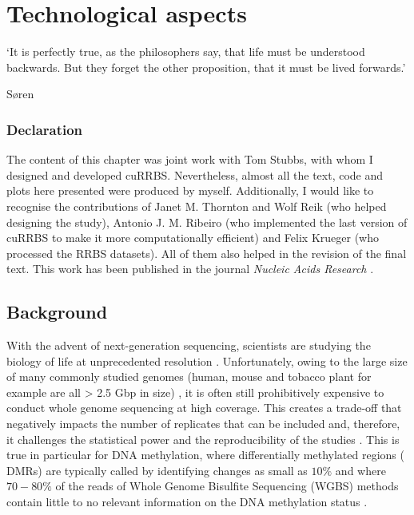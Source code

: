 
\chapter{Technological aspects} \label{c:4}

\ifpdf
	\graphicspath{{Chapter4/Figs/pdf/}}
\else
	\graphicspath{{Chapter4/Figs/svg/}}
\fi

\epigraph{`It is perfectly true, as the philosophers say, that life must be understood backwards. But they forget the other proposition, that it must be lived forwards.'}{Søren \citet{Kierkegaard1843}}

\subsection*{Declaration} 

\footnotesize

The content of this chapter was joint work with Tom Stubbs, with whom I designed and developed cuRRBS. Nevertheless, almost all the text, code and plots here presented were produced by myself. Additionally, I would like to recognise the contributions of Janet M. Thornton and Wolf Reik (who helped designing the study), Antonio J. M. Ribeiro (who implemented the last version of cuRRBS to make it more computationally efficient) and Felix Krueger (who processed the RRBS datasets). All of them also helped in the revision of the final text. This work has been published in the journal \textit{Nucleic Acids Research} \citep{Martin-Herranz2017a}.

\normalsize

\section{Background} \label{s:4.1}

\smallskip

With the advent of next-generation sequencing, scientists are studying the biology of life at unprecedented resolution \citep{Shendure2008}. Unfortunately, owing to the large size of many commonly studied genomes (human, mouse and tobacco plant for example are all > 2.5 \acrshort{Gbp} in size) \citep{Consortium2001,Consortium2002,Sierro2014}, it is often still prohibitively expensive to conduct whole genome sequencing at high coverage. This creates a trade-off that negatively impacts the number of replicates that can be included and, therefore, it challenges the statistical power and the reproducibility of the studies \citep{Fumagalli2013,Wu2015}. This is true in particular for \acrshort{DNA} methylation, where differentially methylated regions ( \acrshort{DMRs}) are typically called by identifying changes as small as $10\%$ and where $70-80\%$ of the reads of Whole Genome Bisulfite Sequencing (\acrshort{WGBS}) methods contain little to no relevant information on the DNA methylation status \citep{Ziller2013}.

